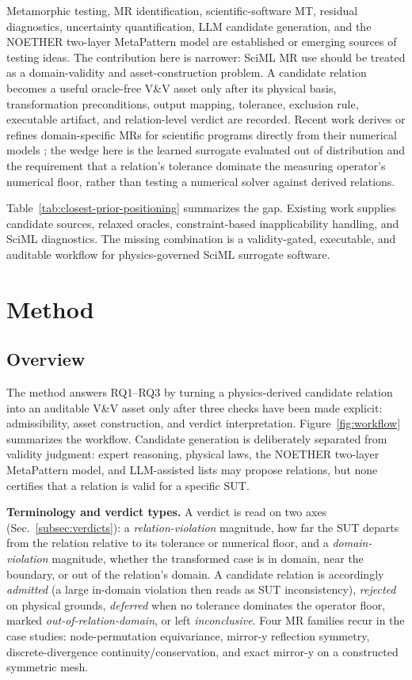 \documentclass[preprint,12pt]{elsarticle}
\begin{document}
Metamorphic testing, MR identification, scientific-software MT, residual diagnostics, uncertainty quantification, LLM candidate generation, and the NOETHER two-layer MetaPattern model are established or emerging sources of testing ideas. The contribution here is narrower: SciML MR use should be treated as a domain-validity and asset-construction problem. A candidate relation becomes a useful oracle-free V\&V asset only after its physical basis, transformation preconditions, output mapping, tolerance, exclusion rule, executable artifact, and relation-level verdict are recorded. Recent work derives or refines domain-specific MRs for scientific programs directly from their numerical models \citep{yan2024elliptic,stevens2025mars}; the wedge here is the learned surrogate evaluated out of distribution and the requirement that a relation's tolerance dominate the measuring operator's numerical floor, rather than testing a numerical solver against derived relations.

Table~\ref{tab:closest-prior-positioning} summarizes the gap. Existing work supplies candidate sources, relaxed oracles, constraint-based inapplicability handling, and SciML diagnostics. The missing combination is a validity-gated, executable, and auditable workflow for physics-governed SciML surrogate software.

\section{Method}
\label{sec:method}

\subsection{Overview}
\label{subsec:method-overview}

The method answers RQ1--RQ3 by turning a physics-derived candidate relation into an auditable V\&V asset only after three checks have been made explicit: admissibility, asset construction, and verdict interpretation. Figure~\ref{fig:workflow} summarizes the workflow. Candidate generation is deliberately separated from validity judgment: expert reasoning, physical laws, the NOETHER two-layer MetaPattern model, and LLM-assisted lists may propose relations, but none certifies that a relation is valid for a specific SUT.

\textbf{Terminology and verdict types.} A verdict is read on two axes (Sec.~\ref{subsec:verdicts}): a \emph{relation-violation} magnitude, how far the SUT departs from the relation relative to its tolerance or numerical floor, and a \emph{domain-violation} magnitude, whether the transformed case is in domain, near the boundary, or out of the relation's domain. A candidate relation is accordingly \emph{admitted} (a large in-domain violation then reads as SUT inconsistency), \emph{rejected} on physical grounds, \emph{deferred} when no tolerance dominates the operator floor, marked \emph{out-of-relation-domain}, or left \emph{inconclusive}. Four MR families recur in the case studies: node-permutation equivariance, mirror-y reflection symmetry, discrete-divergence continuity/conservation, and exact mirror-y on a constructed symmetric mesh.
\end{document}
